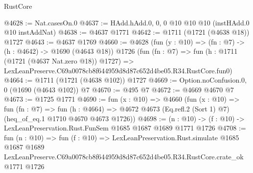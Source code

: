 \begin{lexlean}{RustCore}
\begin{coremodule}
@4628 := Nat.casesOn.{0}
@4637 := HAdd.hAdd.{0, 0, 0} @10 @10 @10 (instHAdd.{0} @10 instAddNat)
@4638 := @4637 @1771
@4642 := @1711 (@1721 (@4638 @18)) @1727
@4643 := @4637 @1769
@4660 := @4628
    (fun (y : @10) => (fn : @7) -> (h : @4642) -> @1690 (@4643 @18))
    @1726
    (fun (fn : @7) =>
    fun (h : @1711 (@1721 (@4637 Nat.zero @18)) @1727) =>
    LexLeanPreserve.C69a0078cb8f644959d8d87c652d4be05.R34.RustCore.fun0)
@4664 := @1711 (@1721 (@4638 @102)) @1727
@4669 := Option.noConfusion.{0, 0} (@1690 (@4643 @102)) @7
@4670 := @495 @7
@4672 := @4669 @4670 @7
@4673 := @1725 @1771
@4690 := fun (x : @10) =>
  @4660
    (fun (x : @10) =>
    fun (fn : @7) =>
    fun (h : @4664) =>
    @4672 @4673 (Eq.refl.{2} (Sort 1) @7) (heq_of_eq.{1} @1710 @4670 @4673 @1726))
@4698 := (n : @10) -> (f : @10) -> LexLeanPreservation.Rust.FunSem @1685 @1687 @1689 @1771 @1726
@4708 := fun (n : @10) =>
  fun (f : @10) =>
  LexLeanPreservation.Rust.simulate
    @1685
    @1687
    @1689
    LexLeanPreserve.C69a0078cb8f644959d8d87c652d4be05.R34.RustCore.crate_ok
    @1771
    @1726
\end{coremodule}
\end{lexlean}
